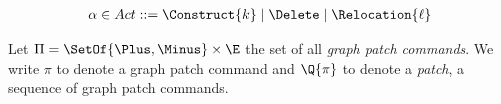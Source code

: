 \[
  \arraycolsep=0pt
  \begin{array}{lcllll}
    \alpha & {}\in{} & Act & {}::={} &
      \Construct{k}
      \mid \Delete
      \mid \Relocation{\ell}
    \\
  \end{array}
\]

Let $\Pi = \SetOf{\Plus, \Minus} \times \E$ the set of all \emph{graph patch commands}.
We write $\pi$ to denote a graph patch command and $\Q{\pi}$ to denote a \textit{patch}, a sequence of graph patch commands.









